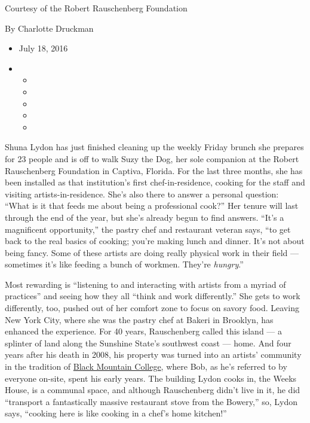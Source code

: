 Courtesy of the Robert Rauschenberg Foundation

By Charlotte Druckman

\begin{itemize}
\item
  July 18, 2016
\item
  \begin{itemize}
  \item
  \item
  \item
  \item
  \item
  \end{itemize}
\end{itemize}

Shuna Lydon has just finished cleaning up the weekly Friday brunch she
prepares for 23 people and is off to walk Suzy the Dog, her sole
companion at the Robert Rauschenberg Foundation in Captiva, Florida. For
the last three months, she has been installed as that institution's
first chef-in-residence, cooking for the staff and visiting
artists-in-residence. She's also there to answer a personal question:
``What is it that feeds me about being a professional cook?'' Her tenure
will last through the end of the year, but she's already begun to find
answers. ``It's a magnificent opportunity,'' the pastry chef and
restaurant veteran says, ``to get back to the real basics of cooking;
you're making lunch and dinner. It's not about being fancy. Some of
these artists are doing really physical work in their field ---
sometimes it's like feeding a bunch of workmen. They're \emph{hungry}.''

Most rewarding is ``listening to and interacting with artists from a
myriad of practices'' and seeing how they all ``think and work
differently.'' She gets to work differently, too, pushed out of her
comfort zone to focus on savory food. Leaving New York City, where she
was the pastry chef at Bakeri in Brooklyn, has enhanced the experience.
For 40 years, Rauschenberg called this island --- a splinter of land
along the Sunshine State's southwest coast --- home. And four years
after his death in 2008, his property was turned into an artists'
community in the tradition of
\href{http://www.nytimes3xbfgragh.onion/2015/03/19/arts/artsspecial/in-the-spirit-of-black-mountain-college-an-avant-garde-incubator.html}{Black
Mountain College}, where Bob, as he's referred to by everyone on-site,
spent his early years. The building Lydon cooks in, the Weeks House, is
a communal space, and although Rauschenberg didn't live in it, he did
``transport a fantastically massive restaurant stove from the Bowery,''
so, Lydon says, ``cooking here is like cooking in a chef's home
kitchen!''

